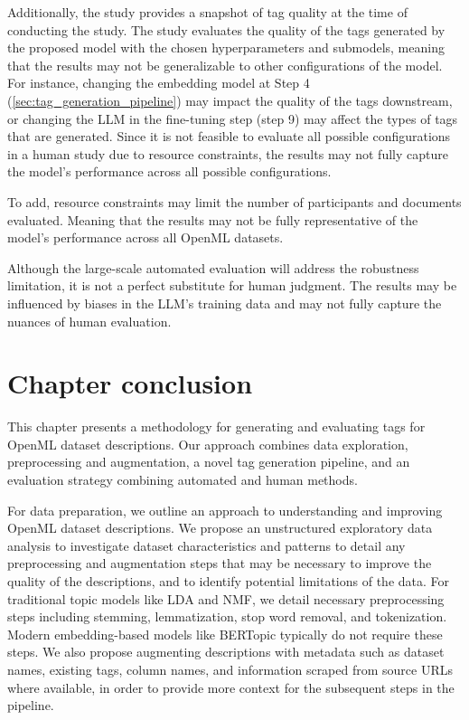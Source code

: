 Additionally, the study provides a snapshot of tag quality at the time of conducting the study. The study evaluates the quality of the tags generated by the proposed model with the chosen hyperparameters and submodels, meaning that the results may not be generalizable to other configurations of the model. For instance, changing the embedding model at Step 4 (\cref{sec:tag_generation_pipeline}) may impact the quality of the tags downstream, or changing the LLM in the fine-tuning step (step 9) may affect the types of tags that are generated. Since it is not feasible to evaluate all possible configurations in a human study due to resource constraints, the results may not fully capture the model's performance across all possible configurations.

To add, resource constraints may limit the number of participants and documents evaluated. Meaning that the results may not be fully representative of the model's performance across all OpenML datasets.

Although the large-scale automated evaluation will address the robustness limitation, it is not a perfect substitute for human judgment. The results may be influenced by biases in the LLM's training data and may not fully capture the nuances of human evaluation.

\section{Chapter conclusion}
This chapter presents a methodology for generating and evaluating tags for OpenML dataset descriptions. Our approach combines data exploration, preprocessing and augmentation, a novel tag generation pipeline, and an evaluation strategy combining automated and human methods.

For data preparation, we outline an approach to understanding and improving OpenML dataset descriptions. We propose an unstructured exploratory data analysis to investigate dataset characteristics and patterns to detail any preprocessing and augmentation steps that may be necessary to improve the quality of the descriptions, and to identify potential limitations of the data. For traditional topic models like LDA and NMF, we detail necessary preprocessing steps including stemming, lemmatization, stop word removal, and tokenization. Modern embedding-based models like BERTopic typically do not require these steps. We also propose augmenting descriptions with metadata such as dataset names, existing tags, column names, and information scraped from source URLs where available, in order to provide more context for the subsequent steps in the pipeline.

